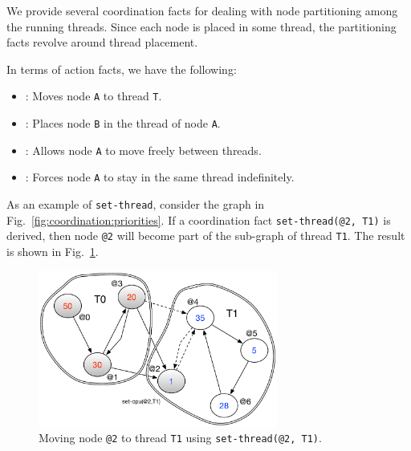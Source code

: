 We provide several coordination facts for dealing with node partitioning among
the running threads. Since each node is placed in some thread, the partitioning
facts revolve around thread placement.

In terms of action facts, we have the
following:

\begin{itemize}
   \item {}: Moves node \texttt{A} to thread
   \texttt{T}.

   \item {}: Places node \texttt{B} in
   the thread of node \texttt{A}.

   \item {}: Allows node \texttt{A} to move freely
   between threads.

   \item {}: Forces node \texttt{A} to stay in the
   same thread indefinitely.

\end{itemize}

As an example of \texttt{set-thread}, consider the graph in
Fig.~\ref{fig:coordination:priorities}. If a coordination fact
\texttt{set-thread(@2, T1)} is derived, then node \texttt{@2} will become part
of the sub-graph of thread \texttt{T1}. The result is shown in
Fig.~\ref{fig:coordination:partitioning}.

\begin{figure}
\begin{center}
   \includegraphics[width=0.7\textwidth]{figures/coordination/partitioning.pdf}
\end{center}
\caption{Moving node \texttt{@2} to thread \texttt{T1} using
   \texttt{set-thread(@2, T1)}.}
\label{fig:coordination:partitioning}
\end{figure}


